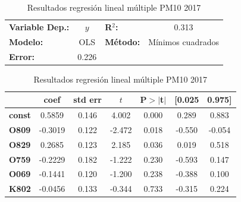 \documentclass[3p,times]{elsarticle}
\begin{document}
\begin{table}[hbt!]
\caption{Resultados regresión lineal múltiple PM10 2017}
\label{tab:RRLM PM10 2017}
\begin{center}
\begin{tabular}{lclc}
\toprule
\textbf{Variable Dep.:}    &        $y$         & \textbf{  R$^2$:         } &     0.313   \\
\textbf{Modelo:}            &       OLS        & \textbf{Método:}           &  Mínimos cuadrados  \\
\textbf{Error:}            & 0.226  \\
\bottomrule
\end{tabular}
\begin{tabular}{lcccccc}
               & \textbf{coef} & \textbf{std err} & \textbf{$t$} & \textbf{P$> |$t$|$} & \textbf{[0.025} & \textbf{0.975]}  \\
\midrule
\textbf{const} &       0.5859  &        0.146     &     4.002  &         0.000        &        0.289    &        0.883     \\
\textbf{O809}  &      -0.3019  &        0.122     &    -2.472  &         0.018        &       -0.550    &       -0.054     \\
\textbf{O829}  &       0.2685  &        0.123     &     2.185  &         0.036        &        0.019    &        0.518     \\
\textbf{O759}  &      -0.2229  &        0.182     &    -1.222  &         0.230        &       -0.593    &        0.147     \\
\textbf{O069}  &      -0.1441  &        0.120     &    -1.200  &         0.238        &       -0.388    &        0.100     \\
\textbf{K802}  &      -0.0456  &        0.133     &    -0.344  &         0.733        &       -0.315    &        0.224     \\
\bottomrule
\end{tabular}
\end{center}
\end{table}
\end{document}
